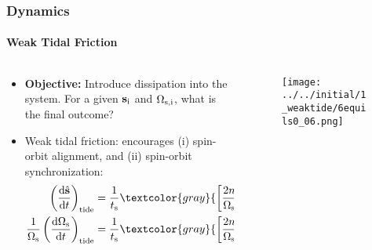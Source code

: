 \documentclass[dvipsnames, 9pt]{beamer}
\newcommand*{\rd}[2]{\frac{\mathrm{d}#1}{\mathrm{d}#2}}
\newcommand*{\bm}[1]{\boldsymbol{\mathbf{#1}}}
\newcommand*{\uv}[1]{\hat{\bm{#1}}}
\newcommand*{\p}[1]{\left(#1\right)}
\newcommand*{\s}[1]{\left[#1\right]}
\begin{document}
\begin{frame}
    \frametitle{Dynamics}
    \framesubtitle{Weak Tidal Friction}

    \begin{columns}
        \begin{column}{0.5\columnwidth}
            \begin{itemize}
                \item \textbf{Objective:} Introduce dissipation into the system.
                    For a given $\bm{s}_{\rm i}$ and $\Omega_{\rm s, i}$, what
                    is the final outcome?

                \item Weak tidal friction: encourages (i) spin-orbit alignment,
                    and (ii) spin-orbit synchronization:
                \begin{align*}
                    \p{\rd{\uv{s}}{t}}_{\rm tide} &= \frac{1}{t_{\rm s}}
                        \textcolor{gray}{\s{\frac{2n}{\Omega_{\rm s}} -
                        \p{\uv{s} \cdot \uv{l}}} \uv{s} \times \p{\uv{l} \times
                        \uv{s}}},\\
                    \frac{1}{\Omega_{\rm s}}\p{\rd{\Omega_{\rm s}}{t}}_{\rm
                            tide}
                        &= \frac{1}{t_{\rm s}} \textcolor{gray}
                        {\s{\frac{2n}{\Omega_{\rm
                        s}}\p{\uv{s} \cdot \uv{l}} - 1 - \p{\uv{s} \cdot
                        \uv{l}}^2}}.
                \end{align*}
            \end{itemize}
        \end{column}
        \begin{column}{0.5\columnwidth}
            \begin{figure}
                \centering
                \texttt{[image: ../../initial/1\_weaktide/6equils0\_06.png]}
            \end{figure}
        \end{column}
    \end{columns}
\end{frame}
\end{document}
